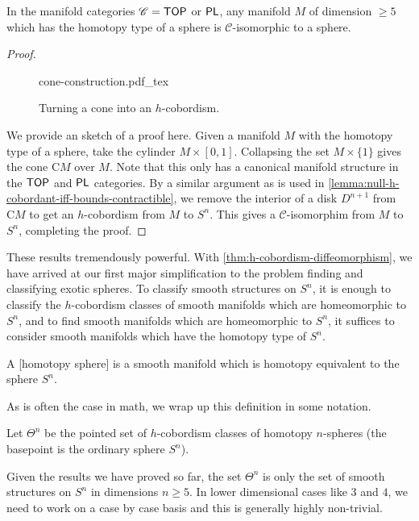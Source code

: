 \begin{corollary}\label{thm:generalized-poincare-smale}
	In the manifold categories $\mathscr{C}=\mathsf{TOP}$ or $\mathsf{PL}$, any manifold $M$ of dimension $\geq 5$ which has the homotopy type of a sphere is $\mathscr{C}$-isomorphic to a sphere.	
\end{corollary}
\begin{proof}
	\begin{figure}[ht]
		\centering
		{cone-construction.pdf_tex}
		\caption{Turning a cone into an $h$-cobordism.}
	\end{figure}

	We provide an sketch of a proof here. Given a manifold $M$ with the homotopy type of a sphere, take the cylinder $M\times [0,1]$. Collapsing the set $M\times \{1\}$ gives the cone $\mathrm{C}M$ over $M$. Note that this only has a canonical manifold structure in the $\mathsf{TOP}$ and $\mathsf{PL}$ categories. By a similar argument as is used in \cref{lemma:null-h-cobordant-iff-bounds-contractible}, we remove the interior of a disk $D^{n+1}$ from $\mathrm{C}M$ to get an $h$-cobordism from $M$ to $S^{n}$. This gives a $\mathscr{C}$-isomorphim from $M$ to $S^n$, completing the proof.
\end{proof}

These results tremendously powerful. With \cref{thm:h-cobordism-diffeomorphism}, we have arrived at our first major simplification to the problem finding and classifying exotic spheres. To classify smooth structures on $S^n$, it is enough to classify the $h$-cobordism classes of smooth manifolds which are homeomorphic to $S^n$, and to find smooth manifolds which are homeomorphic to $S^n$, it suffices to consider smooth manifolds which have the homotopy type of $S^n$.

\begin{definition}
	A [homotopy sphere] is a smooth manifold which is homotopy equivalent to the sphere $S^n$.
\end{definition}

As is often the case in math, we wrap up this definition in some notation.

\begin{definition}
	Let $\Theta^n$ be the pointed set of $h$-cobordism classes of homotopy $n$-spheres (the basepoint is the ordinary sphere $S^n$).
\end{definition}

\begin{remark*}
	Given the results we have proved so far, the set $\Theta^n$ is only the set of smooth structures on $S^n$ in dimensions $n\geq 5$. In lower dimensional cases like $3$ and $4$, we need to work on a case by case basis and this is generally highly non-trivial.
\end{remark*}

\smallrule


